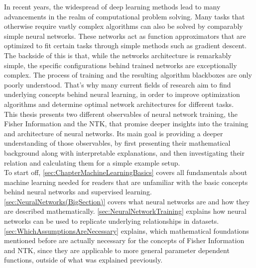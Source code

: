 In recent years, the widespread of deep learning methods lead to many advancements in the realm of computational problem solving. Many tasks that otherwise require vastly complex algorithms can also be solved by comparably simple neural networks. These networks act as function approximators that are optimized to fit certain tasks through simple methods such as gradient descent. The backside of this is that, while the networks architecture is remarkably simple, the specific configurations behind trained networks are exceptionally complex. The process of training and the resulting algorithm blackboxes are only poorly understood. That's why many current fields of research aim to find underlying concepts behind neural learning, in order to improve optimization algorithms and determine optimal network architectures for different tasks.\\
This thesis presents two different observables of neural network training, the Fisher Information and the NTK, that promise deeper insights into the training and architecture of neural networks. Its main goal is providing a deeper understanding of those observables, by first presenting their mathematical background along with interpretable explanations, and then investigating their relation and calculating them for a simple example setup.\\
To start off, \cref{sec:ChapterMachineLearningBasics} covers all fundamentals about machine learning needed for readers that are unfamiliar with the basic concepts behind neural networks and supervised learning. \cref{sec:NeuralNetworks(BigSection)} covers what neural networks are and how they are described mathematically. \cref{sec:NeuralNetworkTraining} explains how neural networks can be used to replicate underlying relationships in datasets. \cref{sec:WhichAssumptionsAreNecessary} explains, which mathematical foundations mentioned before are actually necessary for the concepts of Fisher Information and NTK, since they are applicable to more general parameter dependent functions, outside of what was explained previously.\\
